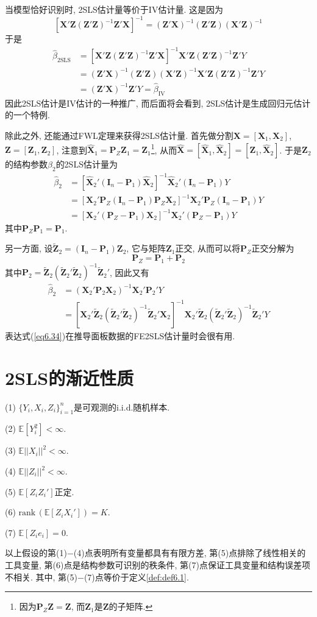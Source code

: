 \documentclass[cn, 12pt, math=mtpro2, bibstyle=apa, blue, twocol]{elegantbook}
\newcommand{\E}{\mathbb{E}}
\newcommand{\X}{\mathbold{X}}
\newcommand{\Z}{\mathbold{Z}}
\newcommand{\hb}{\hat{\beta}}
\begin{document}
当模型恰好识别时, 2SLS估计量等价于IV估计量. 这是因为
$$[\X'\Z(\Z'\Z)^{-1}\Z'\X]^{-1}=(\Z'\X)^{-1}(\Z'\Z)(\X'\Z)^{-1}$$
于是
\begin{align*}
\hb_{\text{2SLS}}&=[\X'\Z(\Z'\Z)^{-1}\Z'\X]^{-1}\X'\Z(\Z'\Z)^{-1}\Z'Y \\
&=(\Z'\X)^{-1}(\Z'\Z)(\X'\Z)^{-1}\X'\Z(\Z'\Z)^{-1}\Z'Y \\
&=(\Z'\X)^{-1}\Z'Y=\hb_{\text{IV}}
\end{align*}
因此2SLS估计是IV估计的一种推广, 而后面将会看到, 2SLS估计是生成回归元估计的一个特例.

除此之外, 还能通过FWL定理来获得2SLS估计量. 首先做分割$\X=[\X_1,\X_2]$, $\Z=[\Z_1,\Z_2]$, 注意到$\hat{\X}_1=\mathbold{P}_Z\Z_1=\Z_1$\footnote{因为$\mathbold{P}_Z\Z=\Z$, 而$\Z_1$是$\Z$的子矩阵.}, 从而$\hat{\X}=[\hat{\X}_1,\hat{\X}_2]=[\Z_1,\hat{\X}_2]$. 于是$\Z_2$的结构参数$\beta_2$的2SLS估计量为
\begin{align*}
\hb_2&=[\hat{\X}_2'(\mathbold{I}_n-\mathbold{P}_1)\hat{\X}_2]^{-1}\hat{\X}_2'(\mathbold{I}_n-\mathbold{P}_1)Y \\
&=[\X_2'\mathbold{P}_Z(\mathbold{I}_n-\mathbold{P}_1)\mathbold{P}_Z\X_2]^{-1}\X_2'\mathbold{P}_Z(\mathbold{I}_n-\mathbold{P}_1)Y \\
&=[\X_2'(\mathbold{P}_Z-\mathbold{P}_1)\X_2]^{-1}\X_2'(\mathbold{P}_Z-\mathbold{P}_1)Y
\end{align*}
其中$\mathbold{P}_Z\mathbold{P}_1=\mathbold{P}_1$.

另一方面, 设$\tilde{\Z}_2=(\mathbold{I}_n-\mathbold{P}_1)\Z_2$, 它与矩阵$\Z_1$正交, 从而可以将$\mathbold{P}_Z$正交分解为$$\mathbold{P}_Z=\mathbold{P}_1+\mathbold{P}_2$$
其中$\mathbold{P}_2=\tilde{\Z}_2(\tilde{\Z}_2'\tilde{\Z}_2)^{-1}\tilde{\Z}_2'$, 因此又有
\begin{align}
\hb_2&=(\X_2'\mathbold{P}_2\X_2)^{-1}\X_2'\mathbold{P}_2'Y \nonumber \\
&=[\X_2'\tilde{\Z}_2(\tilde{\Z}_2'\tilde{\Z}_2)^{-1}\tilde{\Z}_2'\X_2]^{-1}\X_2'\tilde{\Z}_2(\tilde{\Z}_2'\tilde{\Z}_2)^{-1}\tilde{\Z}_2'Y \label{eq6.34}
\end{align}
表达式(\ref{eq6.34})在推导面板数据的FE2SLS估计量时会很有用.

\section{2SLS的渐近性质}
\begin{proposition}\label{pro:pro6.1}
(1) $\{Y_i,X_i,Z_i\}_{i=1}^n$是可观测的i.i.d.随机样本.

(2) $\E[Y^2_i]<\infty$.

(3) $\E||X_i||^2<\infty$.

(4) $\E||Z_i||^2<\infty$.

(5) $\E[Z_iZ_i']$正定.

(6) $\text{rank}\,(\E[Z_iX_i'])=K$.

(7) $\E[Z_ie_i]=0$.
\end{proposition}
以上假设的第(1)$-$(4)点表明所有变量都具有有限方差, 第(5)点排除了线性相关的工具变量, 第(6)点是结构参数可识别的秩条件, 第(7)点保证工具变量和结构误差项不相关. 其中, 第(5)$-$(7)点等价于定义\ref{def:def6.1}.
\end{document}
